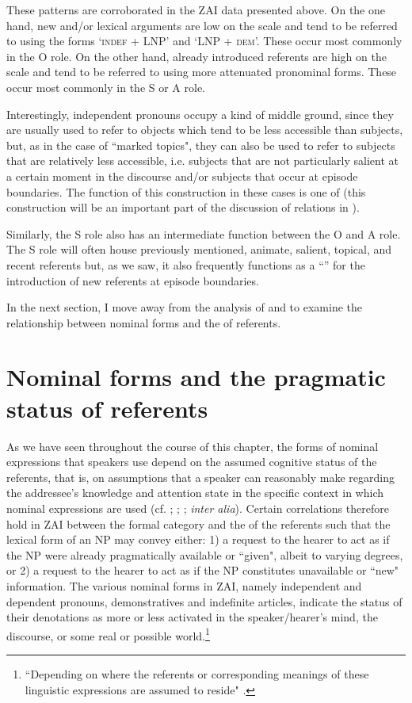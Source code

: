 These patterns are corroborated in the ZAI data presented above. On the one hand, new and/or lexical arguments are low on the  scale and tend to be referred to using the forms `\textsc{indef}  + LNP' and `LNP + \textsc{dem}'. These occur most commonly in the O role. On the other hand, already introduced referents are high on the  scale and tend to be referred to using more attenuated pronominal forms. These occur most commonly in the S or A role. 

\largerpage
Interestingly, independent pronouns occupy a kind of middle ground, since they are usually used to refer to objects which tend to be less accessible than subjects, but, as in the case of ``marked topics", they can also be used to refer to subjects that are relatively less accessible, i.e. subjects that are not particularly salient at a certain moment in the discourse and/or subjects that occur at episode boundaries. The function of this construction in these cases is one of  (this construction will be an important part of the discussion of  relations in ).

Similarly, the S role also has an intermediate function between the O and A role. The S role will often house previously mentioned, animate, salient, topical, and recent referents but, as we saw, it also frequently functions as a ``'' for the introduction of new referents at episode boundaries.

In the next section, I move away from the analysis of  and  to examine the relationship between nominal forms and the  of referents.


\section{Nominal forms and the pragmatic status of referents}\label{nomforms}

As we have seen throughout the course of this chapter, the forms of nominal expressions that speakers use depend on the assumed cognitive status of the referents, that is, on assumptions that a speaker can reasonably make regarding the addressee's knowledge and attention state in the specific context in which nominal expressions are used (cf. \citealt{chafe1976}; \citealt{prince1981}; \citealt{ariel1988}; \textit{inter alia}). Certain correlations therefore hold in ZAI between the formal category and the  of the referents such that the lexical form of an NP may convey either: 1) a request to the hearer to act as if the NP were already pragmatically available or ``given", albeit  to varying degrees, or 2) a request to the hearer to act as if the NP constitutes unavailable or ``new" information. The various nominal forms in ZAI, namely independent and dependent pronouns, demonstratives and indefinite articles, indicate the status of their denotations as more or less activated in the speaker/hearer's mind, the discourse, or some real or possible world.\footnote{``Depending on where the referents or corresponding meanings of these linguistic expressions are assumed to reside" \citep[177]{gundel2001}.} 

